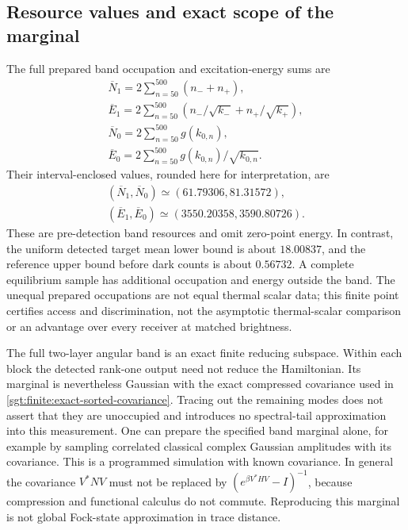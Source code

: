 \documentclass[aps,pra,reprint,superscriptaddress,longbibliography]{revtex4-2}
\begin{document}
\subsection{Resource values and exact scope of the marginal}
\label{sgt:finite:scope}

The full prepared band occupation and excitation-energy sums are
\begin{gather*}
 \overline N_1=2\sum_{n=50}^{500}(n_-+n_+),\\
 \overline E_1=2\sum_{n=50}^{500}
                  (n_-/\sqrt{k_-}+n_+/\sqrt{k_+}),\\
 \overline N_0=2\sum_{n=50}^{500}g(k_{0,n}),\\
 \overline E_0=2\sum_{n=50}^{500}g(k_{0,n})/\sqrt{k_{0,n}}.
\end{gather*}
Their interval-enclosed values, rounded here for interpretation, are
\[
\begin{gathered}
 (\overline N_1,\overline N_0)\simeq(61.79306,81.31572),\\
 (\overline E_1,\overline E_0)\simeq(3550.20358,3590.80726).
\end{gathered}
\]
These are pre-detection band resources and omit zero-point energy.
In contrast, the uniform detected target mean lower bound is about
$18.00837$, and the reference upper bound before dark counts is about
$0.56732$. A complete equilibrium sample has additional occupation
and energy outside the band. The unequal prepared occupations are
not equal thermal scalar data; this finite point certifies access
and discrimination, not the asymptotic thermal-scalar comparison or
an advantage over every receiver at matched brightness.

The full two-layer angular band is an exact finite reducing subspace.
Within each block the detected rank-one output need not reduce the
Hamiltonian. Its marginal is nevertheless Gaussian with the exact
compressed covariance used in
\eqref{sgt:finite:exact-sorted-covariance}. Tracing out the remaining
modes does not assert that they are unoccupied and introduces no
spectral-tail approximation into this measurement. One can prepare
the specified band marginal alone, for example by sampling correlated
classical complex Gaussian amplitudes with its covariance. This is
a programmed simulation with known covariance. In general the
covariance $V^*NV$ must not be replaced by
$(e^{\beta V^*HV}-I)^{-1}$, because compression and functional
calculus do not commute. Reproducing this marginal is not global
Fock-state approximation in trace distance.
\end{document}
